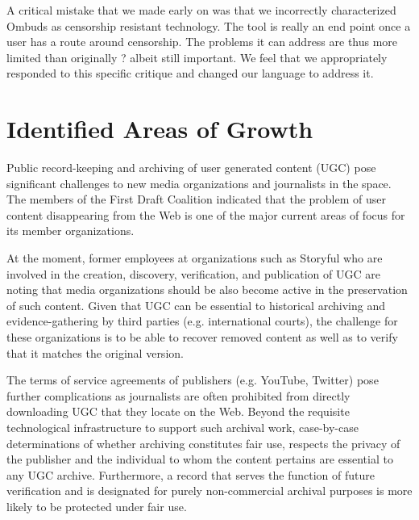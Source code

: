 \documentclass[a4paper]{article}
\begin{document}
A critical mistake that we made early on was that we incorrectly characterized Ombuds as censorship resistant technology. The tool is really an end point once a user has a route around censorship. The problems it can address are thus more limited than originally ? albeit still important. We feel that we appropriately responded to this specific critique and changed our language to address it. \par

\section{Identified Areas of Growth}

Public record-keeping and archiving of user generated content (UGC) pose significant challenges to new media organizations and journalists in the space. The members of the First Draft Coalition indicated that the problem of user content disappearing from the Web is one of the major current areas of focus for its member organizations. \par

At the moment, former employees at organizations such as Storyful who are involved in the creation, discovery, verification, and publication of UGC are noting that media organizations should be also become active in the preservation of such content. Given that UGC can be essential to historical archiving and evidence-gathering by third parties (e.g. international courts), the challenge for these organizations is to be able to recover removed content as well as to verify that it matches the original version.\par

The terms of service agreements of publishers (e.g. YouTube, Twitter) pose further complications as journalists are often prohibited from directly downloading UGC that they locate on the Web. Beyond the requisite technological infrastructure to support such archival work, case-by-case determinations of whether archiving constitutes fair use, respects the privacy of the publisher and the individual to whom the content pertains are essential to any UGC archive. Furthermore, a record that serves the function of future verification and is designated for purely non-commercial archival purposes is more likely to be protected under fair use.\par
\end{document}
